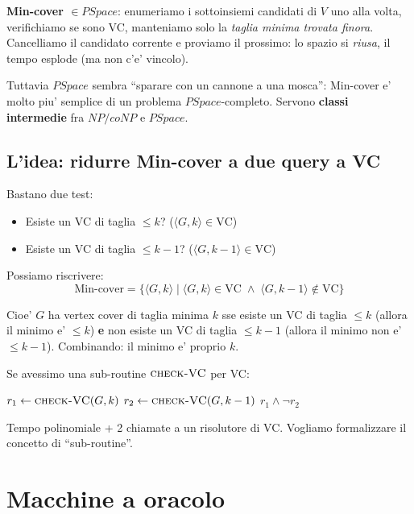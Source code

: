 \textbf{Min-cover $\in PSpace$}: enumeriamo i sottoinsiemi candidati di $V$ uno alla volta, verifichiamo se sono VC, manteniamo solo la \textit{taglia minima trovata finora}. Cancelliamo il candidato corrente e proviamo il prossimo: lo spazio si \textit{riusa}, il tempo esplode (ma non c'e' vincolo).

Tuttavia $PSpace$ sembra ``sparare con un cannone a una mosca'': Min-cover e' molto piu' semplice di un problema $PSpace$-completo. Servono \textbf{classi intermedie} fra $NP/coNP$ e $PSpace$.

\subsection{L'idea: ridurre Min-cover a due query a VC}

Bastano due test:
\begin{itemize}
  \item Esiste un VC di taglia $\leq k$? ($\langle G, k\rangle \in \text{VC}$)
  \item Esiste un VC di taglia $\leq k-1$? ($\langle G, k-1\rangle \in \text{VC}$)
\end{itemize}

Possiamo riscrivere:
\[
  \text{Min-cover} = \{ \langle G, k\rangle \mid \langle G, k\rangle \in \text{VC} \;\wedge\; \langle G, k-1\rangle \notin \text{VC} \}
\]

Cioe' $G$ ha vertex cover di taglia minima $k$ sse esiste un VC di taglia $\leq k$ (allora il minimo e' $\leq k$) \textbf{e} non esiste un VC di taglia $\leq k-1$ (allora il minimo non e' $\leq k-1$). Combinando: il minimo e' proprio $k$.

Se avessimo una sub-routine $\textsc{check-VC}$ per VC:

\begin{algorithm}[H]
  \DontPrintSemicolon
  \caption{$\textsc{min-cover}(G, k)$}
  $r_1 \leftarrow \textsc{check-VC}(G, k)$\;
  $r_2 \leftarrow \textsc{check-VC}(G, k-1)$\;
  \KwRet $r_1 \wedge \neg r_2$\;
\end{algorithm}

Tempo polinomiale + 2 chiamate a un risolutore di VC. Vogliamo formalizzare il concetto di ``sub-routine''.

\section{Macchine a oracolo}


